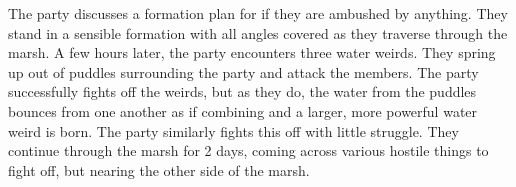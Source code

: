 The party discusses a formation plan for if they are ambushed by anything. They stand in a sensible formation with all angles covered as they traverse through the marsh. A few hours later, the party encounters three water weirds. They spring up out of puddles surrounding the party and attack the members. The party successfully fights off the weirds, but as they do, the water from the puddles bounces from one another as if combining and a larger, more powerful water weird is born. The party similarly fights this off with little struggle. They continue through the marsh for 2 days, coming across various hostile things to fight off, but nearing the other side of the marsh.


